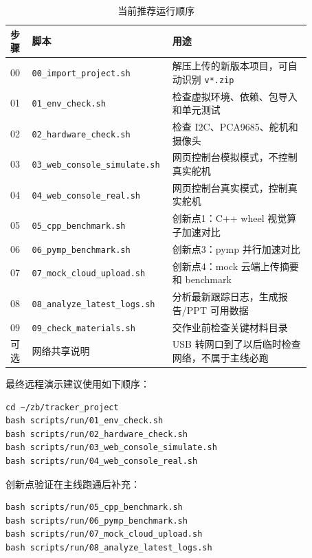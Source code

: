 \documentclass[
  oneside,
  degree=bachelor,
  field=science,
  fullwidthstop=circle,
  fontset=windows,
  times=false,
  minted=false,
  biblatex=false,
  algo=algpseudocode,
]{tongjithesis}
\newcommand{\code}[1]{\texttt{#1}}
\begin{document}
\begin{table}[htbp]
  \centering
  \caption{当前推荐运行顺序}
  \label{tab:scripts}
  \footnotesize
  \setlength{\tabcolsep}{3pt}
  \begin{tabular}{p{0.07\linewidth}p{0.35\linewidth}p{0.45\linewidth}}
    \toprule
    步骤 & 脚本 & 用途 \\
    \midrule
    00 & \code{00\_import\_project.sh} & 解压上传的新版本项目，可自动识别 \code{v*.zip} \\
    01 & \code{01\_env\_check.sh} & 检查虚拟环境、依赖、包导入和单元测试 \\
    02 & \code{02\_hardware\_check.sh} & 检查 I2C、PCA9685、舵机和摄像头 \\
    03 & \code{03\_web\_console\_simulate.sh} & 网页控制台模拟模式，不控制真实舵机 \\
    04 & \code{04\_web\_console\_real.sh} & 网页控制台真实模式，控制真实舵机 \\
    05 & \code{05\_cpp\_benchmark.sh} & 创新点1：C++ wheel 视觉算子加速对比 \\
    06 & \code{06\_pymp\_benchmark.sh} & 创新点3：pymp 并行加速对比 \\
    07 & \code{07\_mock\_cloud\_upload.sh} & 创新点4：mock 云端上传摘要和 benchmark \\
    08 & \code{08\_analyze\_latest\_logs.sh} & 分析最新跟踪日志，生成报告/PPT 可用数据 \\
    09 & \code{09\_check\_materials.sh} & 交作业前检查关键材料目录 \\
    可选 & 网络共享说明 & USB 转网口到了以后临时检查网络，不属于主线必跑 \\
    \bottomrule
  \end{tabular}
\end{table}

最终远程演示建议使用如下顺序：

\begin{verbatim}
cd ~/zb/tracker_project
bash scripts/run/01_env_check.sh
bash scripts/run/02_hardware_check.sh
bash scripts/run/03_web_console_simulate.sh
bash scripts/run/04_web_console_real.sh
\end{verbatim}

创新点验证在主线跑通后补充：

\begin{verbatim}
bash scripts/run/05_cpp_benchmark.sh
bash scripts/run/06_pymp_benchmark.sh
bash scripts/run/07_mock_cloud_upload.sh
bash scripts/run/08_analyze_latest_logs.sh
\end{verbatim}
\end{document}
